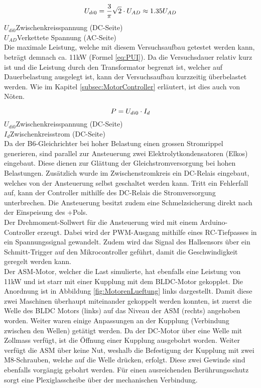 \begin{equation}
\centering
U_{di0}=\frac{3}{\pi}\sqrt{2}\cdot U_{AD}\approx 1.35U_{AD}
\label{eq:B6-Spannung}
\end{equation}
$  U_{di0} $\quad  Zwischenkreisspannung (DC-Seite)      \\
$ U_{AD} $\quad  Verkettete Spannung (AC-Seite)        \\

Die maximale Leistung, welche mit diesem Versuchsaufbau getestet werden kann, beträgt demnach ca. 11kW (Formel \ref{eq:PUI}). Da die Versuchsdauer relativ kurz ist und die Leistung durch den Transformator begrenzt ist, welcher auf Dauerbelastung ausgelegt ist, kann der Versuchsaufbau kurzzeitig überbelastet werden. Wie im Kapitel \ref{subsec:MotorController} erläutert, ist dies auch von Nöten.

\begin{equation}
\centering
P=U_{di0}\cdot I_{d}
\label{eq:PUI}
\end{equation}
$  U_{di0} $\quad  Zwischenkreisspannung (DC-Seite)      \\
$ I_{d} $\quad\quad 	Zwischenkreisstrom (DC-Seite)      \\


Da der B6-Gleichrichter bei hoher Belastung einen grossen Stromrippel generieren, sind parallel zur Ansteuerung zwei Elektrolytkondensatoren (Elkos) eingebaut. Diese dienen zur Glättung der Gleichstromversorgung bei hohen Belastungen. Zusätzlich wurde im Zwischenstromkreis ein DC-Relais eingebaut, welches von der Ansteuerung selbst geschaltet werden kann. Tritt ein Fehlerfall auf, kann der Controller mithilfe des DC-Relais die Stromversorgung unterbrechen. Die Ansteuerung besitzt zudem eine Schmelzsicherung direkt nach der Einspeisung des +Pols.\\

Der Drehmoment-Sollwert für die Ansteuerung wird mit einem Arduino-Controller erzeugt. Dabei wird der PWM-Ausgang mithilfe eines RC-Tiefpasses in ein Spannungssignal gewandelt. Zudem wird das Signal des Hallsensors über ein Schmitt-Trigger auf den Mikrocontroller geführt, damit die Geschwindigkeit geregelt werden kann.\\
Der ASM-Motor, welcher die Last simulierte, hat ebenfalls eine Leistung von 11kW und ist starr mit einer Kupplung mit dem BLDC-Motor gekopplet. Die Anordnung ist in Abbildung \ref{fig:MotorenLueftung} links dargestellt. Damit diese zwei Maschinen überhaupt miteinander gekoppelt werden konnten, ist zuerst die Welle des BLDC Motors (links) auf das Niveau der ASM (rechts) angehoben worden. Weiter waren einige Anpassungen an der Kupplung (Verbindung zwischen den Wellen) getätigt werden. Da der DC-Motor über eine Welle mit Zollmass verfügt, ist die Öffnung einer Kupplung ausgebohrt worden. Weiter verfügt die ASM über keine Nut, weshalb die Befestigung der Kupplung mit zwei M8-Schrauben, welche auf die Welle drücken, erfolgt. Diese zwei Gewinde sind ebenfalls vorgängig gebohrt werden. Für einen ausreichenden Berührungsschutz sorgt eine Plexiglasscheibe über der mechanischen Verbindung.


